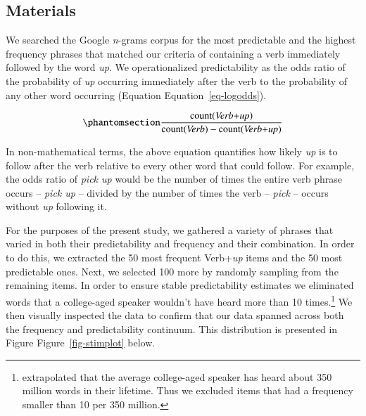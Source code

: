 \documentclass[
  authoryear,
  preprint,
  1p,
  onecolumn]{elsarticle}
\begin{document}
\subsection{Materials}\label{materials}

We searched the Google \emph{n}-grams corpus
\citep{linSyntacticAnnotationsGoogle2012} for the most predictable and
the highest frequency phrases that matched our criteria of containing a
verb immediately followed by the word \emph{up}. We operationalized
predictability as the odds ratio of the probability of \emph{up}
occurring immediately after the verb to the probability of any other
word occurring (Equation Equation~\ref{eq-logodds}).

\begin{equation}\phantomsection\label{eq-logodds}{
\frac{\mathrm{count(\textit{Verb+up})}}{\mathrm{count(\textit{Verb})} - \mathrm{count(\textit{Verb+up})}} 
}\end{equation}

In non-mathematical terms, the above equation quantifies how likely
\emph{up} is to follow after the verb relative to every other word that
could follow. For example, the odds ratio of \emph{pick up} would be the
number of times the entire verb phrase occurs -- \emph{pick up} --
divided by the number of times the verb -- \emph{pick} -- occurs without
\emph{up} following it.

For the purposes of the present study, we gathered a variety of phrases
that varied in both their predictability and frequency and their
combination. In order to do this, we extracted the 50 most frequent
Verb+\emph{up} items and the 50 most predictable ones. Next, we selected
100 more by randomly sampling from the remaining items. In order to
ensure stable predictability estimates we eliminated words that a
college-aged speaker wouldn't have heard more than 10 times.\footnote{\citet{levyProcessingExtraposedStructures2012}
  extrapolated that the average college-aged speaker has heard about 350
  million words in their lifetime. Thus we excluded items that had a
  frequency smaller than 10 per 350 million.} We then visually inspected
the data to confirm that our data spanned across both the frequency and
predictability continuum. This distribution is presented in Figure
Figure~\ref{fig-stimplot} below.
\end{document}
